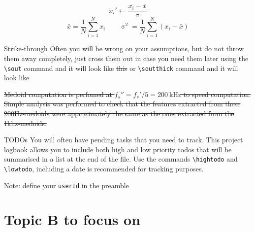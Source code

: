 \documentclass{project-logbook}
\begin{document}
		\begin{equation}
    			x_i' \gets \frac{x_i-\bar{x}}{\upsigma}
		\end{equation}
		\begin{equation}
    			\bar{x} = \frac{1}{N}\sum_{i=1}^{N} x_i \qquad \upsigma^2 = {\frac{1}{N}\sum_{i=1}^{N} (x_i-\bar{x})}
		\end{equation}

		\begin{HighlightedNote}{Strike-through}
 			Often you will be wrong on your assumptions, but do not throw them away completely, just cross them out in case you need them later using the \texttt{\textbackslash sout} command and it will look like \sout{this} or \texttt{\textbackslash soutthick} command and it will look like 
		\end{HighlightedNote}

		\sout{Medoid computation is perfomed at $f_s'' = f_s'/5 = \SI{200}{\kilo\hertz}$ to speed computation. Simple analysis was performed to check that the features extracted from these 200Hz-medoids were approximately the same as the ones extracted from the  1khz-medoids.}


		\begin{HighlightedNote}{TODOs}
			You will often have pending tasks that you need to track. This project logbook allows you to include both high and low priority todos that will be summarised in a list at the end of the file. Use the commands \texttt{\textbackslash hightodo} and \texttt{\textbackslash lowtodo}, including a date is recommended for tracking purposes.

			Note: define your \texttt{userId} in the preamble
		\end{HighlightedNote}





\section{Topic B to focus on} \label{sec:topic_B}
\end{document}
